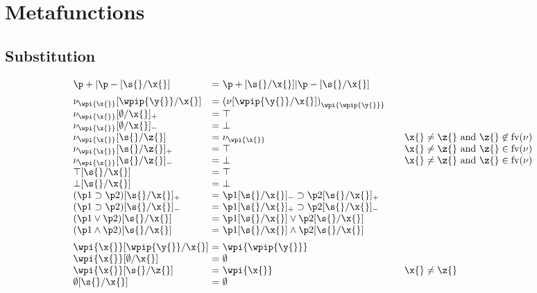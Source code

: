 \documentclass{article}[12pt]
\begin{document}
\newpage

\section{Metafunctions}

\subsection{Substitution}

\newcommand{\sxo}[1]{\subs{#1}{\s{}}{\x{}}}
\newcommand{\sxom}[1]{\subsminus{#1}{\s{}}{\x{}}}
\newcommand{\sxop}[1]{\subsplus{#1}{\s{}}{\x{}}}

$$
  \begin{array}{l@{\ =\ }l@{\qquad}l}
  \sxo{\p+|\p-} & \sxo{\p+}|\sxo{\p-} & \vspace{2mm}\\


  \subs{\nu_{\wpi{\x{}}}}{\wpip{\y{}}}{\x{}} & {(\subs{\nu}{\wpip{\y{}}}{\x{}})}_{\wpi{\wpip{\y{}}}} & \\
  \subsplus{\nu_{\wpi{\x{}}}}{\noobj}{\x{}} & \top & \\
  \subsminus{\nu_{\wpi{\x{}}}}{\noobj}{\x{}} & \bot & \\
  \subs{\nu_{\wpi{\x{}}}}{\s{}}{\z{}} & {{\nu}_{\wpi{\x{}}}} & \x{}
  \neq \z{} \text { and } \z{} \not\in \fv{\nu}\\
  \subsplus{\nu_{\wpi{\x{}}}}{\s{}}{\z{}} & \top & \x{}
  \neq \z{} \text { and } \z{} \in \fv{\nu}\\
  \subsminus{\nu_{\wpi{\x{}}}}{\s{}}{\z{}} & \bot & \x{}
  \neq \z{} \text { and } \z{} \in \fv{\nu}\\
  \sxo{\top} & \top & \\
  \sxo{\bot} & \bot & \\
  \sxop{(\imp{\p1}{\p2})} & \imp{\sxom{\p1}}{\sxop{\p2}}& \\
  \sxom{(\imp{\p1}{\p2})} & \imp{\sxop{\p1}}{\sxom{\p2}}& \\
  \sxo{({\p1}\vee{\p2})} & {\sxo{\p1}}\vee{\sxo{\p2}}& \\
  \sxo{({\p1}\wedge{\p2})} & {\sxo{\p1}}\wedge{\sxo{\p2}}&
  \vspace{2mm}\\

  \subs{\wpi{\x{}}}{\wpip{\y{}}}{\x{}} & \wpi{\wpip{\y{}}}& \\
  \subs{\wpi{\x{}}}{\noobj}{\x{}} & \noobj & \\
  \subs{\wpi{\x{}}}{\s{}}{\z{}} & \wpi{{\x{}}}& \x{} \neq \z{}\\
  \sxo{\noobj} & \noobj \\
  \end{array}
$$
\end{document}
